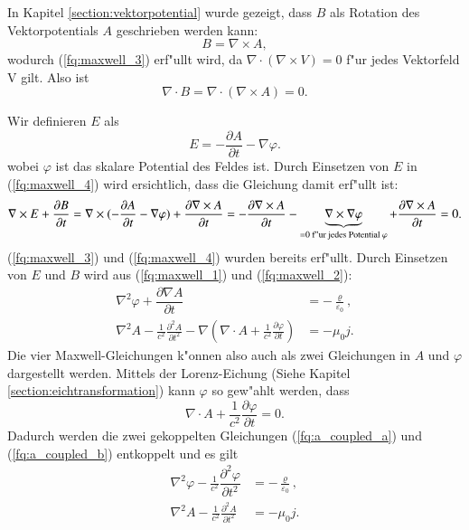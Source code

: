 In Kapitel \ref{section:vektorpotential} wurde gezeigt, dass $B$ als Rotation des Vektorpotentials $A$ geschrieben werden kann:
\begin{equation}
B = \nabla\times A,
\end{equation}
wodurch (\ref{fq:maxwell_3}) erf"ullt wird, da $\nabla \cdot ( \nabla\times V ) = 0$ f"ur jedes Vektorfeld V gilt. Also ist
\begin{equation*}
\nabla \cdot B = \nabla \cdot ( \nabla\times A ) = 0.
\end{equation*}

Wir definieren $E$ als
\begin{equation}
E = -\dfrac{\partial A}{\partial t} - \nabla \varphi.
\end{equation}
wobei $\varphi$ ist das skalare Potential des Feldes ist. Durch Einsetzen von $E$ in (\ref{fq:maxwell_4}) wird ersichtlich, dass die Gleichung damit erf"ullt ist:
\begin{equation*}
\nabla\times E + \frac{\partial B }{\partial t} = \nabla\times (-\dfrac{\partial A}{\partial t} - \nabla \varphi) + \frac{\partial \nabla\times A }{\partial t} = 
- \frac{\partial \nabla\times A }{\partial t} - \underbrace{\nabla\times \nabla \varphi}_{=0\text{ f"ur jedes Potential } \varphi} + \frac{\partial \nabla\times A }{\partial t} = 0.\\
\end{equation*}
(\ref{fq:maxwell_3}) und (\ref{fq:maxwell_4}) wurden bereits erf"ullt. Durch Einsetzen von $E$ und $B$ wird aus (\ref{fq:maxwell_1}) und (\ref{fq:maxwell_2}):
\begin{align} 
 \label{fq:a_coupled_a}
 \nabla^2 \varphi + \dfrac{\partial \nabla A}{\partial t} &= -\frac{\varrho}{\varepsilon_0}, \\
 \label{fq:a_coupled_b}
 \nabla^2 A - \frac{1}{c^2} \frac{\partial^2 A }{\partial t^2} - \nabla \left( \nabla \cdot A + \frac{1}{c^2} \frac{\partial \varphi }{\partial t} \right) &= - \mu_0 j.
\end{align}
Die vier Maxwell-Gleichungen k"onnen also auch als zwei Gleichungen in $A$ und $\varphi$ dargestellt werden.
Mittels der Lorenz-Eichung (Siehe Kapitel \ref{section:eichtransformation}) kann $\varphi$ so gew"ahlt werden, dass
\begin{equation} \label{fq:lorenz_eq}
\nabla \cdot A + \frac{1}{c^2} \frac{\partial \varphi }{\partial t} = 0.
\end{equation}
Dadurch werden die zwei gekoppelten Gleichungen (\ref{fq:a_coupled_a}) und (\ref{fq:a_coupled_b}) entkoppelt und es gilt
\begin{align*}
\nabla^2 \varphi - \frac{1}{c^2} \dfrac{\partial^2 \varphi}{\partial t^2} &= -\frac{\varrho}{\varepsilon_0}, \\
\nabla^2 A - \frac{1}{c^2} \frac{\partial^2 A }{\partial t^2} &= - \mu_0 j.
\end{align*}

